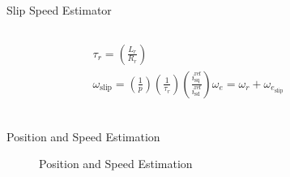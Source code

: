 \begin{frame}{Slip Speed Estimator}
	\begin{columns}
		\begin{figure}
			\centering
		\end{figure}
		\begin{equation*}
			\begin{gathered}
				\tau_r = \left(\frac{L_r}{R_r}\right) \\[0.5em]
				\omega_\text{slip} = \left(\frac{1}{p}\right)\left(\frac{1}{\tau_r}\right)\left(\frac{i_\text{sq}^\text{ref}}{i_\text{sd}^\text{ref}}\right)
				\omega_e = \omega_r + \omega_{e_\text{slip}} \\[0.5em]
			\end{gathered}
		\end{equation*}
	\end{columns}
\end{frame}

\begin{frame}{Position and Speed Estimation}
	\begin{figure}
		\centering

		\caption{Position and Speed Estimation}
	\end{figure}
\end{frame}




